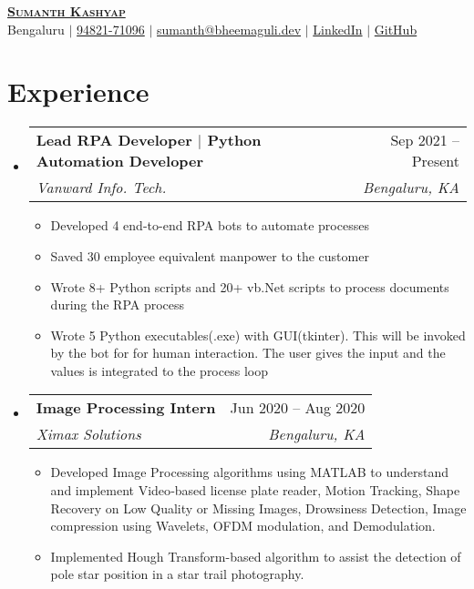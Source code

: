 \documentclass[letterpaper, 11pt]{article}
\makeatletter
\newcommand{\resumeItem}[1]{ \item\small{ {#1 \vspace{-2pt}} } }
\newcommand{\resumeSubheading}[4]{
\vspace{-2pt}
\item
\begin{tabular*}{0.97\textwidth}[t]{l@{\extracolsep{\fill}}r}
	\textbf{#1}       & #2                 \\
	\textit{\small#3} & \textit{\small #4} \\
\end{tabular*}
\vspace{-7pt}
}
\newcommand{\resumeSubHeadingListStart}{\begin{itemize}[leftmargin=0.15in, label={}]}
\newcommand{\resumeSubHeadingListEnd}{\end{itemize}}
\newcommand{\resumeItemListStart}{\begin{itemize}}
\newcommand{\resumeItemListEnd}{\end{itemize}
\vspace{-5pt}}
\makeatother
\begin{document}
	\begin{center}
		\textbf{\Huge \scshape
		\href{https://bheemaguli.dev/}{Sumanth Kashyap{\tiny\textcolor{blue}{\faLink}}}}
		\\
		\vspace{1pt}
		\faMapMarker \hspace{0.2mm} Bengaluru \faPhone \hspace{0.2mm} $|$
		\href{tel:+91-9482171096}{94821-71096} \faEnvelope \hspace{0.2mm} $|$
		\href{mailto:sumanth@bheemaguli.dev}{sumanth@bheemaguli.dev} \faLinkedin\hspace{0.2mm}
		$|$ \href{https://www.linkedin.com/in/bheemaguli/}{LinkedIn} \faGithub \hspace{0.2mm}
		$|$ \href{https://github.com/bheemaguli/}{GitHub}
	\end{center}

	\section{Experience}
	\resumeSubHeadingListStart

	\resumeSubheading {Lead RPA Developer $|$ {\transparent{0.75}Python Automation Developer}}{Sep 2021 -- Present}
	{Vanward Info. Tech.}{Bengaluru, KA} \resumeItemListStart \resumeItem{Developed 4 end-to-end RPA bots to automate processes}
	\resumeItem{Saved 30 employee equivalent manpower to the customer} \resumeItem{Wrote 8+ Python scripts and 20+ vb.Net scripts to process documents during the RPA process}
	\resumeItem{Wrote 5 Python executables(.exe) with GUI(tkinter). This will be invoked by the bot for for human interaction. The user gives the input and the values is integrated to the process loop}
	\resumeItemListEnd \resumeSubheading {Image Processing Intern}{Jun 2020 -- Aug 2020}
	{Ximax Solutions}{Bengaluru, KA} \resumeItemListStart \resumeItem{Developed Image Processing algorithms using MATLAB to understand and implement Video‐based license plate reader, Motion Tracking, Shape Recovery on Low Quality or Missing Images, Drowsiness Detection, Image compression using Wavelets, OFDM modulation, and Demodulation.}
	\resumeItem{Implemented Hough Transform-based algorithm to assist the detection of pole star position in a star trail photography.}
	\resumeItemListEnd \resumeSubHeadingListEnd

\end{document}
